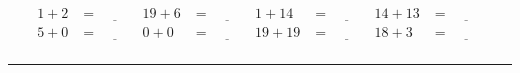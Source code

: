 \documentclass{article}
\begin{document}
\begin{sloppy}
\begin{align*}
    {1} + {2} &= \underline{\hspace{1cm}} & {19} + {6} &= \underline{\hspace{1cm}} & {1} + {14} &= \underline{\hspace{1cm}} & {14} + {13} &= \underline{\hspace{1cm}} \\
    {5} + {0} &= \underline{\hspace{1cm}} & {0} + {0} &= \underline{\hspace{1cm}} & {19} + {19} &= \underline{\hspace{1cm}} & {18} + {3} &= \underline{\hspace{1cm}} \\
\end{align*}
\hrule
\end{sloppy}
\end{document}
